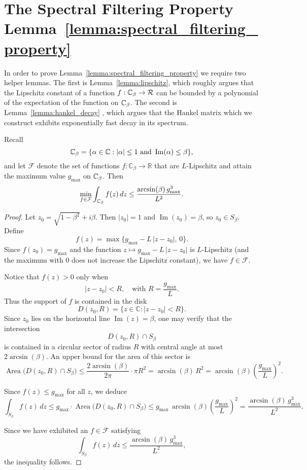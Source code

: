 \section{The Spectral Filtering Property Lemma~\ref{lemma:spectral_filtering_property}}
\label{appendix:spectral_filtering_property}


In order to prove Lemma~\ref{lemma:spectral_filtering_property} we require two helper lemmas. The first is Lemma~\ref{lemma:lipschitz}, which roughly argues that the Lipschitz constant of a function $f: \mathbb{C}_{\beta} \to {\mathcal R}$ can be bounded by a polynomial of the expectation of the function on $\mathbb{C}_{\beta}$. The second is Lemma~\ref{lemma:hankel_decay} , which argues that the Hankel matrix which we construct exhibits exponentially fast decay in its spectrum. 




\begin{lemma}
\label{lemma:lipschitz}
Recall 
\[
\mathbb{C}_{\beta} = \{ \alpha\in\mathbb{C} : |\alpha|\le 1 \text{ and } \operatorname{Im}(\alpha)\le \beta \},
\]
and let $\mathcal{F}$ denote the set of functions $f:\mathbb{C}_{\beta} \to\mathbb{R}$ that are $L$-Lipschitz and attain the maximum value $g_{\max}$ on $\mathbb{C}_\beta$. Then 
\[
\min_{f\in\mathcal{F}} \int_{\mathbb{C}_\beta} f(z)\,dz \le \frac{\arcsin(\beta)\,g_{\max}^3}{L^2}.
\]
\end{lemma}

\begin{proof}

Let $ z_0 = \sqrt{1-\beta^2} + i\beta$.
Then $|z_0|=1$ and $\operatorname{Im}(z_0)=\beta$, so $z_0\in S_\beta$. Define
\[
f(z) = \max\{ g_{\max} - L\,|z-z_0|,\,0\}.
\]
Since $f(z_0)=g_{\max}$ and the function $z\mapsto g_{\max}-L\,|z-z_0|$ is $L$-Lipschitz (and the maximum with $0$ does not increase the Lipschitz constant), we have $f\in\mathcal{F}$.

\medskip

Notice that $f(z)>0$ only when
\[
|z-z_0| < R,\quad\text{with } R = \frac{g_{\max}}{L}.
\]
Thus the support of $f$ is contained in the disk
\[
D(z_0,R) = \{ z\in\mathbb{C} : |z-z_0| < R \}.
\]
Since $z_0$ lies on the horizontal line $\operatorname{Im}(z)=\beta$, one may verify that the intersection
\[
D(z_0,R)\cap S_\beta
\]
is contained in a circular sector of radius $R$ with central angle at most $2\arcsin(\beta)$. An upper bound for the area of this sector is
\[
\operatorname{Area}\bigl(D(z_0,R)\cap S_\beta\bigr) \le \frac{2\arcsin(\beta)}{2\pi} \cdot \pi R^2 
= \arcsin(\beta) \, R^2 
= \arcsin(\beta) \left(\frac{g_{\max}}{L}\right)^2.
\]

Since $f(z)\le g_{\max}$ for all $z$, we deduce
\[
\int_{S_\beta} f(z)\,dz \le g_{\max}\cdot \operatorname{Area}\bigl(D(z_0,R)\cap S_\beta\bigr)
\le g_{\max}\,\arcsin(\beta) \left(\frac{g_{\max}}{L}\right)^2
= \frac{\arcsin(\beta)\, g_{\max}^3}{L^2}.
\]

\medskip
Since we have exhibited an $f\in\mathcal{F}$ satisfying
\[
\int_{S_\beta} f(z)\,dz \le \frac{\arcsin(\beta)\, g_{\max}^3}{L^2},
\]
the inequality follows.

\end{proof}



